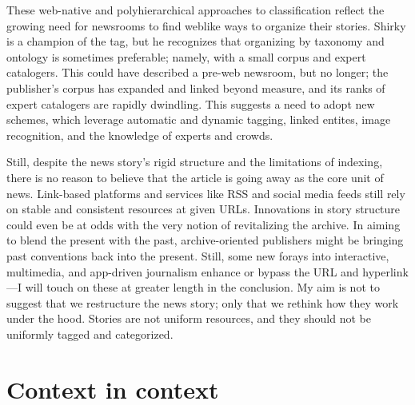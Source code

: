 These web-native and polyhierarchical approaches to classification reflect the growing need for newsrooms to find weblike ways to organize their stories. Shirky is a champion of the tag, but he recognizes that organizing by taxonomy and ontology is sometimes preferable; namely, with a small corpus and expert catalogers.\autocite{shirky_ontology_2005} This could have described a pre-web newsroom, but no longer; the publisher's corpus has expanded and linked beyond measure, and its ranks of expert catalogers are rapidly dwindling. This suggests a need to adopt new schemes, which leverage automatic and dynamic tagging, linked entites, image recognition, and the knowledge of experts and crowds.

Still, despite the news story's rigid structure and the limitations of indexing, there is no reason to believe that the article is going away as the core unit of news. Link-based platforms and services like RSS and social media feeds still rely on stable and consistent resources at given URLs. Innovations in story structure could even be at odds with the very notion of revitalizing the archive. In aiming to blend the present with the past, archive-oriented publishers might be bringing past conventions back into the present. Still, some new forays into interactive, multimedia, and app-driven journalism enhance or bypass the URL and hyperlink---I will touch on these at greater length in the conclusion. My aim is not to suggest that we restructure the news story; only that we rethink how they work under the hood. Stories are not uniform resources, and they should not be uniformly tagged and categorized.




\section{Context in context}

